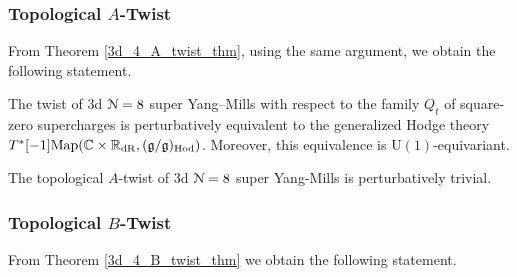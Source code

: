 \documentclass[10pt, oneside]{article}
\renewcommand{\U}{\mathrm{U}}
\begin{document}

\subsubsection{Topological $A$-Twist}
\label{sect:3d8A_Twist}
From Theorem \ref{3d_4_A_twist_thm}, using the same argument, we obtain the following statement.

\begin{theorem} \label{3d_8_A_twist_thm}
The twist of 3d $\mathcal N=8$ super Yang--Mills with respect to the family $Q_t$ of square-zero supercharges is perturbatively equivalent to the generalized Hodge theory $T^*[-1]\mathrm{Map}(\mathbb C \times \mathbb R_{\mathrm{dR}}, (\mathfrak{g}/\mathfrak{g})_{\mathrm{Hod}})$. Moreover, this equivalence is $\U(1)$-equivariant.
\end{theorem}

\begin{corollary}
The topological $A$-twist of 3d $\mathcal N=8$ super Yang-Mills is perturbatively trivial.
\end{corollary}

\subsubsection{Topological $B$-Twist}
\label{sect:3d8B_Twist}
From Theorem \ref{3d_4_B_twist_thm} we obtain the following statement.
\end{document}
